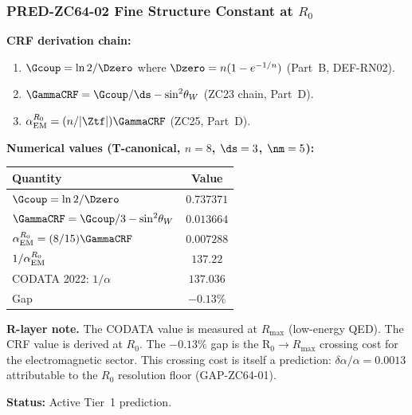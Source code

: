 \documentclass[12pt, a4paper]{article}
\renewcommand{\swsq}{\sin^2\!\theta_W}
\renewcommand{\aEM}{\alpha_{\rm EM}}
\begin{document}
\subsubsection{PRED-ZC64-02 \quad Fine Structure Constant at $R_0$}
\label{sec:pred02}


\begin{predbox}[title={PRED-ZC64-02: $\aEM^{R_0} = (n/15)\GammaCRF$
  (Tier~1, $R_0$)}]
\textbf{CRF derivation chain:}
\begin{enumerate}[leftmargin=2em, noitemsep]
  \item $\Gcoup = \ln2/\Dzero$ where $\Dzero = n(1-e^{-1/n})$
    (Part~B, DEF-RN02).
  \item $\GammaCRF = \Gcoup/\ds - \swsq$ (ZC23 chain, Part~D).
  \item $\aEM^{R_0} = (n/|\Ztf|)\GammaCRF$ (ZC25, Part~D).
\end{enumerate}

\textbf{Numerical values (T-canonical, $n=8$, $\ds=3$, $\nm=5$):}
\begin{center}
\begin{tabular}{@{}lc@{}}
\toprule
Quantity & Value \\
\midrule
$\Gcoup = \ln2/\Dzero$ & $0.737371$ \\
$\GammaCRF = \Gcoup/3 - \swsq$ & $0.013664$ \\
$\aEM^{R_0} = (8/15)\GammaCRF$ & $0.007288$ \\
$1/\aEM^{R_0}$ & $137.22$ \\
CODATA 2022: $1/\alpha$ & $137.036$ \\
Gap & $-0.13\%$ \\
\bottomrule
\end{tabular}
\end{center}

\textbf{R-layer note.}
The CODATA value is measured at $R_{\max}$ (low-energy QED).
The CRF value is derived at $R_0$.
The $-0.13\%$ gap is the R$_0\to R_{\max}$ crossing cost
for the electromagnetic sector.
This crossing cost is itself a prediction:
$\delta\alpha/\alpha = 0.0013$ attributable to
the $R_0$ resolution floor (GAP-ZC64-01).

\textbf{Status:} Active Tier~1 prediction.
\end{predbox}
\end{document}
